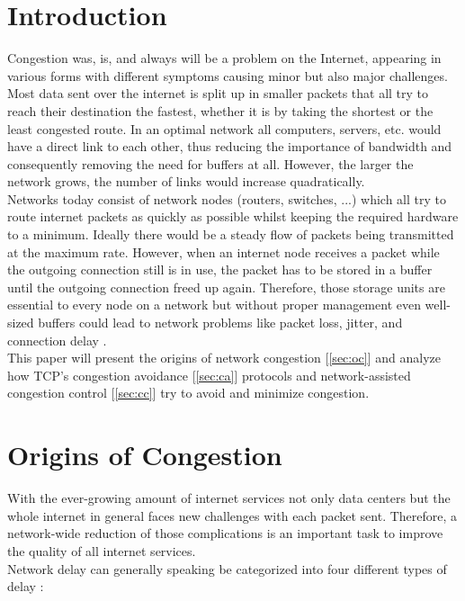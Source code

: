\documentclass[a4paper,conference]{IEEEtran}
\begin{document}
\section{Introduction}
Congestion was, is, and always will be a problem on the Internet, appearing in various forms with different symptoms causing minor but also major challenges. Most data sent over the internet is split up in smaller packets that all try to reach their destination the fastest, whether it is by taking the shortest or the least congested route. In an optimal network all computers, servers, etc. would have a direct link to each other, thus reducing the importance of bandwidth and  consequently removing the need for buffers at all. However, the larger the network grows, the number of links would increase quadratically.
\\Networks today consist of network nodes (routers, switches, ...) which all try to route internet packets as quickly as possible whilst keeping the required hardware to a minimum. Ideally there would be a steady flow of packets being transmitted at the maximum rate. However, when an internet node receives a packet while the outgoing connection still is in use, the packet has to be stored in a buffer until the outgoing connection freed up again. Therefore, those storage units are essential to every node on a network but without proper management even well-sized buffers could lead to network problems like packet loss, jitter, and connection delay \cite{appenzeller2004sizing}.
\\This paper will present the origins of network congestion [\autoref{sec:oc}] and analyze how TCP's congestion avoidance [\autoref{sec:ca}] protocols and network-assisted congestion control [\autoref{sec:cc}] try to avoid and minimize congestion.

\section{Origins of Congestion}
\label{sec:oc}
With the ever-growing amount of internet services not only data centers but the whole internet in general faces new challenges with each packet sent. Therefore, a network-wide reduction of those complications is an important task to improve the quality of all internet services.
\\Network delay can generally speaking be categorized into four different types of delay \cite{gettys2012bufferbloat}:
\end{document}
